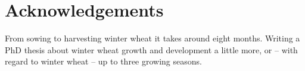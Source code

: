 \chapter*{Acknowledgements}
\renewcommand{\sectionmark}[1]{ \markright{ \MakeUppercase{#1} } }

From sowing to harvesting winter wheat it takes around eight months. Writing a PhD thesis about winter wheat growth and development a little more, or -- with regard to winter wheat -- up to three growing seasons.


